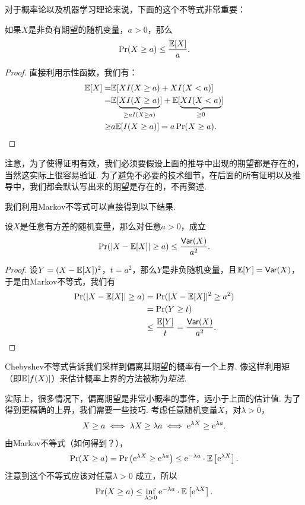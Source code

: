 对于概率论以及机器学习理论来说，下面的这个不等式非常重要：

\begin{theorem}[Markov不等式]\label{thm:markov-inequality}
    如果$X$是非负有期望的随机变量，$a>0$，那么
        \[
            \Pr(X\geq a) \leq \frac{\mathbb{E}[X]}{a}.
        \]
\end{theorem}

\begin{proof}
直接利用示性函数，我们有：
    \begin{align*}
        \mathbb{E}[X] = &\mathbb{E}[X I(X\geq a)+X I(X<a)]\\
        =&\mathbb{E}[\underbrace{X I(X\geq a)}_{\geq aI(X\geq a)}]+\mathbb{E}[\underbrace{XI(X<a)}_{\geq 0}]\\
        \geq& a\mathbb{E}[I(X\geq a)]=a\Pr(X\geq a).
    \end{align*}
\end{proof}

注意，为了使得证明有效，我们必须要假设上面的推导中出现的期望都是存在的，当然这实际上很容易验证. 为了避免不必要的技术细节，在后面的所有证明以及推导中，我们都会默认写出来的期望是存在的，不再赘述. 

我们利用Markov不等式可以直接得到以下结果. 
\begin{corollary}[Chebyshev不等式]\label{cor:chebyshev-inequality}
设$X$是任意有方差的随机变量，那么对任意$a>0$，成立
    \[
        \Pr(|X - \mathbb{E}[X]| \geq a) \leq \frac{\mathsf{Var}(X)}{a^2}.
    \]
\end{corollary}
\begin{proof}
设$Y=(X-\mathbb{E}[X])^2$，$t=a^2$，那么$Y$是非负随机变量，且$\mathbb{E}[Y]=\mathsf{Var}(X)$，于是由Markov不等式，我们有
\begin{align*}
    \Pr(|X - \mathbb{E}[X]| \geq a) &= \Pr(|X - \mathbb{E}[X]|^2 \geq a^2) \\
    &=\Pr(Y \geq t) \\
    &\leq \frac{\mathbb{E}[Y]}{t}=\frac{\mathsf{Var}(X)}{a^2}.
\end{align*}
\end{proof}

Chebyshev不等式告诉我们采样到偏离其期望的概率有一个上界. 像这样利用矩（即$\mathbb{E}[f(X)]$）来估计概率上界的方法被称为\textit{矩法}. 

实际上，很多情况下，偏离期望是非常小概率的事件，远小于上面的估计值. 为了得到更精确的上界，我们需要一些技巧. 考虑任意随机变量$X$，对$\lambda >0$，
\[
X\geq a \iff \lambda X \geq \lambda a \iff \mathrm{e}^{\lambda X} \geq \mathrm{e}^{\lambda a}.
\]
由Markov不等式（如何得到？），
\[
\Pr(X\geq a) = \Pr\left(\mathrm{e}^{\lambda X} \geq \mathrm{e}^{\lambda a}\right) \leq \mathrm{e}^{- \lambda a}\cdot \mathbb{E}\left[\mathrm{e}^{\lambda X}\right]. 
\]
注意到这个不等式应该对任意$\lambda > 0$ 成立，所以
\[
\Pr(X\geq a) \leq \inf_{\lambda >0} \mathrm{e}^{- \lambda a}\cdot \mathbb{E} \left[\mathrm{e}^{\lambda X}\right].
\]

